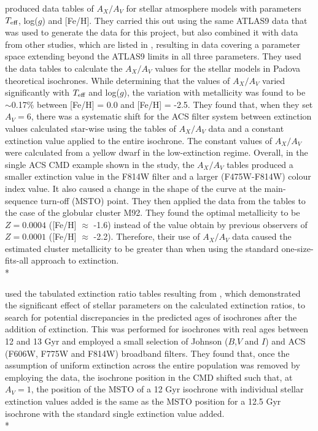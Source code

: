 \documentclass[12pt, a4paper]{report}
\begin{document}
\cite{2008PASP..120..583G} produced data tables of $A_{X}/A_{V}$ for stellar atmosphere models with parameters $T_{\textnormal{eff}}$, log($g$) and [Fe/H]. They carried this out using the same ATLAS9 data \citep{2004astro.ph..5087C} that was used to generate the data for this project, but also combined it with data from other studies, which are listed in \cite{2002A&A...391..195G}, resulting in data covering a parameter space extending beyond the ATLAS9 limits in all three parameters. They used the data tables to calculate the $A_{X}/A_{V}$ values for the stellar models in Padova theoretical isochrones. While determining that the values of $A_{X}/A_{V}$ varied significantly with $T_{\textnormal{eff}}$ and log($g$), the variation with metallicity was found to be $\sim$0.17$\%$ between [Fe/H] = 0.0 and [Fe/H] = -2.5. They found that, when they set $A_{V} = 6$, there was a systematic shift for the ACS filter system between extinction values calculated star-wise using the tables of $A_{X}/A_{V}$ data and a constant extinction value applied to the entire isochrone. The constant values of $A_{X}/A_{V}$ were calculated from a yellow dwarf in the low-extinction regime. Overall, in the single ACS CMD example shown in the study, the $A_{X}/A_{V}$ tables produced a smaller extinction value in the F814W filter and a larger (F475W-F814W) colour index value. It also caused a change in the shape of the curve at the main-sequence turn-off (MSTO) point. They then applied the data from the tables to the case of the globular cluster M92. They found the optimal metallicity to be $Z = 0.0004$ ([Fe/H] $\approx$ -1.6) instead of the value obtain by previous observers of $Z = 0.0001$ ([Fe/H] $\approx$ -2.2). Therefore, their use of $A_{X}/A_{V}$ data caused the estimated cluster metallicity to be greater than when using the standard one-size-fits-all approach to extinction.\\*

\cite{2017Galax...5...28O} used the tabulated extinction ratio tables resulting from \cite{2008PASP..120..583G}, which demonstrated the significant effect of stellar parameters on the calculated extinction ratios, to search for potential discrepancies in the predicted ages of isochrones after the addition of extinction. This was performed for isochrones with real ages between 12 and 13 Gyr and employed a small selection of Johnson ($B$,$V$ and $I$) and ACS (F606W, F775W and F814W) broadband filters. They found that, once the assumption of uniform extinction across the entire population was removed by employing the \cite{2008PASP..120..583G} data, the isochrone position in the CMD shifted such that, at $A_{V} = 1$, the position of the MSTO of a 12 Gyr isochrone with individual stellar extinction values added is the same as the MSTO position for a 12.5 Gyr isochrone with the standard single extinction value added.\\*
\end{document}
